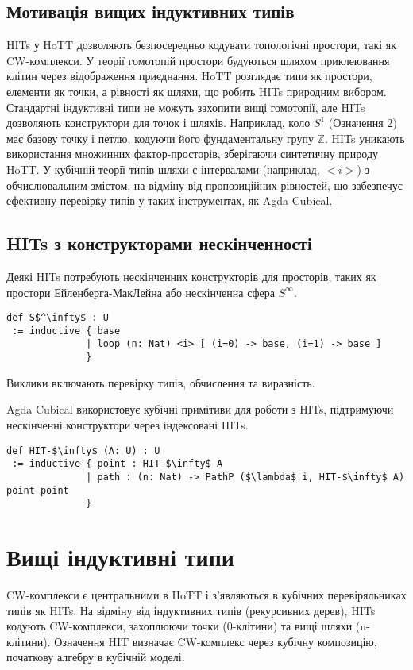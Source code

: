 \documentclass{article}
\theoremstyle{definition}
\begin{document}
\subsection{Мотивація вищих індуктивних типів}
HITs у HoTT дозволяють безпосередньо кодувати топологічні простори, такі як
CW-комплекси. У теорії гомотопій простори будуються шляхом приклеювання
клітин через відображення приєднання. HoTT розглядає типи як простори, елементи
як точки, а рівності як шляхи, що робить HITs природним вибором.
Стандартні індуктивні типи не можуть захопити вищі гомотопії, але
HITs дозволяють конструктори для точок і шляхів. Наприклад, коло \( S^1 \) (Означення 2) має базову точку і петлю, кодуючи його
фундаментальну групу \( \mathbb{Z} \). HITs уникають використання множинних
фактор-просторів, зберігаючи синтетичну природу HoTT. У кубічній теорії типів шляхи є
інтервалами (наприклад, \( <i> \)) з обчислювальним змістом, на відміну від
пропозиційних рівностей, що забезпечує ефективну перевірку типів у таких
інструментах, як Agda Cubical.

\subsection{HITs з конструкторами нескінченності}
Деякі HITs потребують нескінченних конструкторів для просторів, таких як простори Ейленберга-МакЛейна або нескінченна сфера \( S^\infty \).
\begin{lstlisting}[mathescape=true]
def S$^\infty$ : U
 := inductive { base
              | loop (n: Nat) <i> [ (i=0) -> base, (i=1) -> base ]
              }
\end{lstlisting}
Виклики включають перевірку типів, обчислення та виразність.

Agda Cubical використовує кубічні примітиви для роботи з HITs, підтримуючи
нескінченні конструктори через індексовані HITs.

\begin{lstlisting}[mathescape=true]
def HIT-$\infty$ (A: U) : U
 := inductive { point : HIT-$\infty$ A
              | path : (n: Nat) -> PathP ($\lambda$ i, HIT-$\infty$ A) point point
              }
\end{lstlisting}

\section{Вищі індуктивні типи}
CW-комплекси є центральними в HoTT і з’являються в кубічних перевіряльниках типів як HITs.
На відміну від індуктивних типів (рекурсивних дерев), HITs кодують CW-комплекси, захоплюючи
точки (0-клітини) та вищі шляхи (n-клітини). Означення HIT визначає CW-комплекс
через кубічну композицію, початкову алгебру в кубічній моделі.
\end{document}
